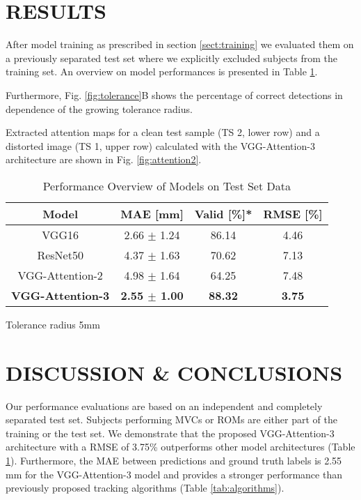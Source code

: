 \documentclass[letterpaper, 10 pt, conference]{ieeeconf}
\begin{document}
\section{RESULTS} 
\label{sect:results}
After model training as prescribed in section \ref{sect:training} we evaluated them on a previously separated test set where we explicitly excluded subjects from the training set. An overview on model performances is presented in Table \ref{tab:results}.

Furthermore, Fig. \ref{fig:tolerance}B shows the percentage of correct detections in dependence of the growing tolerance radius.

Extracted attention maps for a clean test sample (TS 2, lower row) and a distorted image (TS 1, upper row) calculated with the VGG-Attention-3 architecture are shown in Fig. \ref{fig:attention2}. 
\begin{table}[h]
\caption{Performance Overview of Models on Test Set Data}
\label{tab:results}
\begin{center}
\hspace*{-1.55cm}
\renewcommand{\arraystretch}{1.25}
\begin{tabular}{cccc}
\toprule
\textbf{Model}  & \textbf{MAE [mm]} & \textbf{Valid [\%]*} &\textbf{RMSE [\%]}\\ 
\midrule
VGG16 \cite{VGG}  & 2.66 $\pm$ 1.24 & 86.14  & 4.46   \\
ResNet50 \cite{ResNet}  & 4.37 $\pm$ 1.63   & 70.62  & 7.13   \\
VGG-Attention-2 \cite{Attention}  & 4.98 $\pm$ 1.64    & 64.25  &  7.48  \\
\textbf{VGG-Attention-3 \cite{Attention}}  & \textbf{2.55 $\pm$ 1.00}    & \textbf{88.32}  &  \textbf{3.75}  \\
\bottomrule
\end{tabular}
\begin{tablenotes}
    \item * Tolerance radius 5mm
    \end{tablenotes}
\end{center}
\end{table}
\section{DISCUSSION \& CONCLUSIONS} 
\label{sect:discussion}
Our performance evaluations are based on an independent and completely separated test set. Subjects performing MVCs or ROMs are either part of the training or the test set. We demonstrate that the proposed VGG-Attention-3 architecture with a RMSE of 3.75\% outperforms other model architectures (Table \ref{tab:results}). Furthermore, the MAE between predictions and ground truth labels is 2.55 mm for the VGG-Attention-3 model and provides a stronger performance than previously proposed tracking algorithms (Table \ref{tab:algorithms}). 
\end{document}
